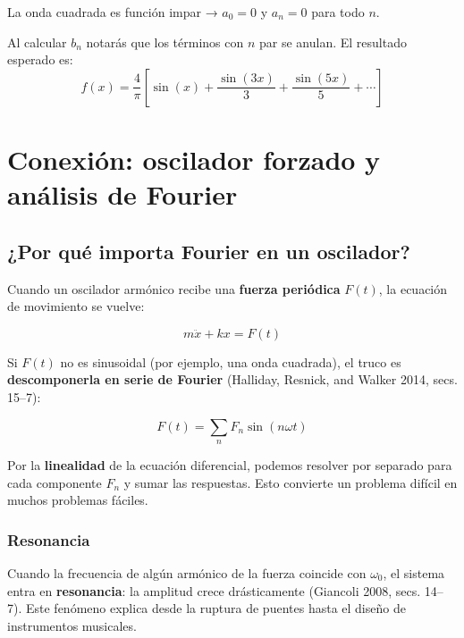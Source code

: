 \documentclass[
  letterpaper,
  DIV=11,
  numbers=noendperiod]{scrreprt}
\begin{document}
\begin{tcolorbox}[enhanced jigsaw, colbacktitle=quarto-callout-tip-color!10!white, toptitle=1mm, titlerule=0mm, rightrule=.15mm, colframe=quarto-callout-tip-color-frame, leftrule=.75mm, breakable, colback=white, bottomrule=.15mm, coltitle=black, bottomtitle=1mm, title=\textcolor{quarto-callout-tip-color}{\faLightbulb}\hspace{0.5em}{Pista}, arc=.35mm, toprule=.15mm, left=2mm, opacitybacktitle=0.6, opacityback=0]

La onda cuadrada es función impar → \(a_0 = 0\) y \(a_n = 0\) para todo
\(n\).

Al calcular \(b_n\) notarás que los términos con \(n\) par se anulan. El
resultado esperado es: \[
f(x) = \frac{4}{\pi}\left[\sin(x) + \frac{\sin(3x)}{3} + \frac{\sin(5x)}{5} + \cdots\right]
\]

\end{tcolorbox}

\chapter{Conexión: oscilador forzado y análisis de
Fourier}\label{sec-conexion}

\section{¿Por qué importa Fourier en un
oscilador?}\label{por-quuxe9-importa-fourier-en-un-oscilador}

Cuando un oscilador armónico recibe una \textbf{fuerza periódica}
\(F(t)\), la ecuación de movimiento se vuelve:

\[
m\ddot{x} + kx = F(t)
\]

Si \(F(t)\) no es sinusoidal (por ejemplo, una onda cuadrada), el truco
es \textbf{descomponerla en serie de Fourier} (Halliday, Resnick, and
Walker 2014, secs. 15--7):

\[
F(t) = \sum_{n} F_n \sin(n\omega t)
\]

Por la \textbf{linealidad} de la ecuación diferencial, podemos resolver
por separado para cada componente \(F_n\) y sumar las respuestas. Esto
convierte un problema difícil en muchos problemas fáciles.

\subsection{Resonancia}\label{resonancia}

Cuando la frecuencia de algún armónico de la fuerza coincide con
\(\omega_0\), el sistema entra en \textbf{resonancia}: la amplitud crece
drásticamente (Giancoli 2008, secs. 14--7). Este fenómeno explica desde
la ruptura de puentes hasta el diseño de instrumentos musicales.
\end{document}
